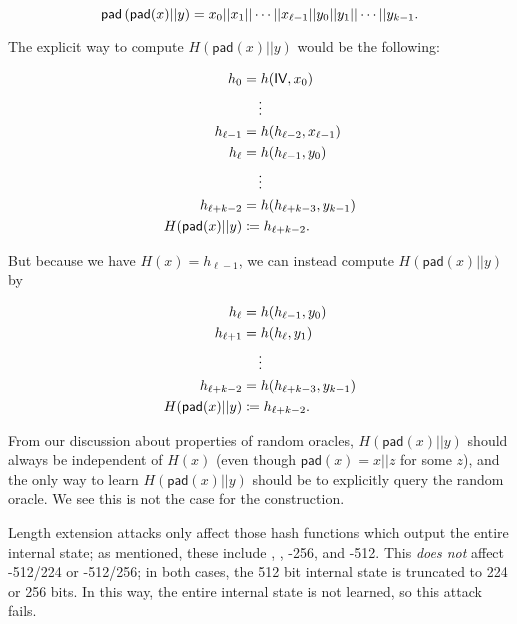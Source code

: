 \begin{equation}
    \textsf{pad}\left( \textsf{pad}(x)||y \right) = 
        x_{0}||x_{1}||\cdots||x_{\ell-1}||y_{0}||y_{1}||\cdots||y_{k-1}.
\end{equation}

The explicit way to compute $H(\textsf{pad}(x)||y)$ would be
the following:

\begin{align}
    h_{0} &= h(\textsf{IV}, x_{0}) \nonumber\\
        &\quad \vdots \nonumber\\
    h_{\ell-1} &= h(h_{\ell-2}, x_{\ell-1}) \nonumber\\
    h_{\ell} &= h(h_{\ell-1}, y_{0}) \nonumber\\
        &\quad \vdots \nonumber\\
    h_{\ell+k-2} &= h(h_{\ell+k-3}, y_{k-1}) \nonumber\\
    H(\textsf{pad}(x)||y) &\coloneqq{} h_{\ell+k-2}.
\end{align}

\noindent
But because we have $H(x) = h_{\ell-1}$, we can instead compute
$H(\textsf{pad}(x)||y)$ by

\begin{align}
    h_{\ell} &= h(h_{\ell-1}, y_{0}) \nonumber\\
    h_{\ell+1} &= h(h_{\ell}, y_{1}) \nonumber\\
        &\quad \vdots \nonumber\\
    h_{\ell+k-2} &= h(h_{\ell+k-3}, y_{k-1}) \nonumber\\
    H(\textsf{pad}(x)||y) &\coloneqq{} h_{\ell+k-2}.
\end{align}

\noindent
From our discussion about properties of \glspl{random oracle},
$H(\textsf{pad}(x)||y)$ should always be independent of $H(x)$
(even though $\textsf{pad}(x) = x||z$ for some $z$),
and the only way to learn $H(\textsf{pad}(x)||y)$ should be to explicitly
query the \gls{random oracle}.
We see this is not the case for the \MD{} construction.

Length extension attacks only affect those \glspl{hash function} which output
the entire internal state;
as mentioned, these include \MDFive{}, \ShaOne{}, \ShaTwo{}-256,
and \ShaTwo{}-512.
This \emph{does not} affect \ShaTwo{}-512/224 or \ShaTwo{}-512/256;
in both cases, the 512 bit internal state is truncated
to 224 or 256 bits.
In this way, the entire internal state is not learned,
so this attack fails.

